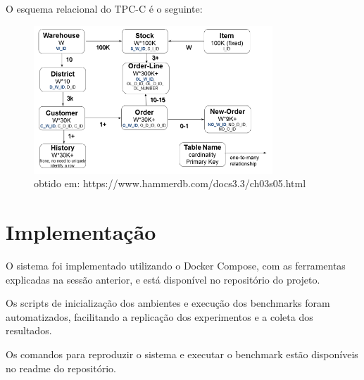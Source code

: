 \begin{itemize}
	O esquema relacional do TPC-C é o seguinte:
	\begin{figure}[H]
		\centering
		\includegraphics[width=0.8\textwidth]{imgs/ch3-2.png}
		\caption{obtido em: https://www.hammerdb.com/docs3.3/ch03s05.html}
		\label{fig:tpc-c}
	\end{figure}
\end{itemize}

\section{Implementação}

O sistema foi implementado utilizando o Docker Compose, com as ferramentas explicadas na sessão anterior,
e está disponível no repositório do projeto.

Os scripts de inicialização dos ambientes e execução dos benchmarks foram automatizados,
facilitando a replicação dos experimentos e a coleta dos resultados.

Os comandos para reproduzir o sistema e executar o benchmark estão disponíveis no readme do repositório.